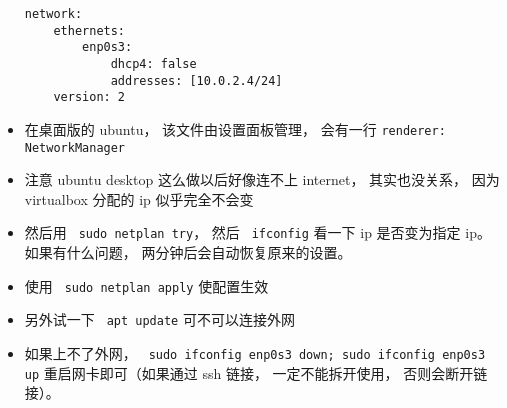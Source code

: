 \begin{itemize}
\begin{lstlisting}[language=none]
network:
    ethernets:
        enp0s3:
            dhcp4: false
            addresses: [10.0.2.4/24]
    version: 2
\end{lstlisting}
\item 在桌面版的 ubuntu， 该文件由设置面板管理， 会有一行 \verb|renderer: NetworkManager|
\item 注意 ubuntu desktop 这么做以后好像连不上 internet， 其实也没关系， 因为 virtualbox 分配的 ip 似乎完全不会变
\item 然后用 \verb` sudo netplan try`， 然后 \verb` ifconfig` 看一下 ip 是否变为指定 ip。 如果有什么问题， 两分钟后会自动恢复原来的设置。
\item 使用 \verb` sudo netplan apply` 使配置生效
\item 另外试一下 \verb` apt update` 可不可以连接外网
\item 如果上不了外网， \verb` sudo ifconfig enp0s3 down; sudo ifconfig enp0s3 up` 重启网卡即可（如果通过 ssh 链接， 一定不能拆开使用， 否则会断开链接）。
\end{itemize}
